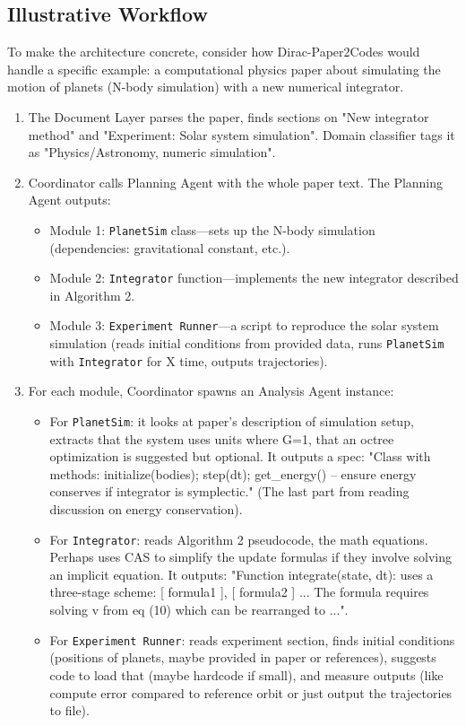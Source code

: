 \documentclass{ieeeaccess}
\begin{document}
\subsection{Illustrative Workflow}
To make the architecture concrete, consider how Dirac-Paper2Codes would handle a specific example: a computational physics paper about simulating the motion of planets (N-body simulation) with a new numerical integrator.
\begin{enumerate}
\item The Document Layer parses the paper, finds sections on "New integrator method" and "Experiment: Solar system simulation".
Domain classifier tags it as "Physics/Astronomy, numeric simulation".
\item Coordinator calls Planning Agent with the whole paper text. The Planning Agent outputs:
\begin{itemize}
\item Module 1: \texttt{PlanetSim} class---sets up the N-body simulation (dependencies: gravitational constant, etc.).
\item Module 2: \texttt{Integrator} function---implements the new integrator described in Algorithm 2.
\item Module 3: \texttt{Experiment Runner}---a script to reproduce the solar system simulation (reads initial conditions from provided data, runs \texttt{PlanetSim} with \texttt{Integrator} for X time, outputs trajectories).
\end{itemize}
\item For each module, Coordinator spawns an Analysis Agent instance:
\begin{itemize}
\item For \texttt{PlanetSim}: it looks at paper's description of simulation setup, extracts that the system uses units where G=1, that an octree optimization is suggested but optional. It outputs a spec: "Class with methods: initialize(bodies); step(dt); get\_energy() -- ensure energy conserves if integrator is symplectic." (The last part from reading discussion on energy conservation).
\item For \texttt{Integrator}: reads Algorithm 2 pseudocode, the math equations. Perhaps uses CAS to simplify the update formulas if they involve solving an implicit equation. It outputs: "Function integrate(state, dt): uses a three-stage scheme: [ formula1 ], [ formula2 ] ... The formula requires solving v from eq (10) which can be rearranged to ...".
\item For \texttt{Experiment Runner}: reads experiment section, finds initial conditions (positions of planets, maybe provided in paper or references), suggests code to load that (maybe hardcode if small), and measure outputs (like compute error compared to reference orbit or just output the trajectories to file).

\end{itemize}
\end{enumerate}
\end{document}

